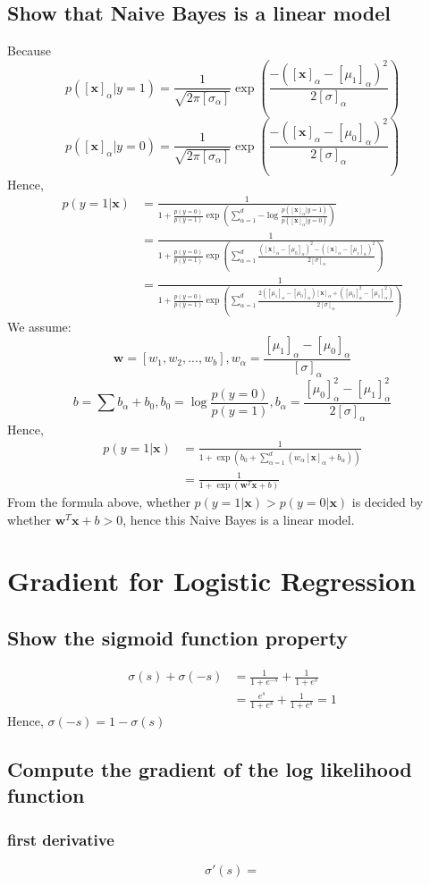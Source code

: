 \documentclass{article}
\begin{document}
	\subsection{Show that Naive Bayes is a linear model}
	Because
	\[
		p([\textbf{x}]_{\alpha}|y=1)=
		\frac{1}{\sqrt{2\pi[\sigma_{\alpha}]}}
		\exp\left({
			\frac{
			-([\textbf{x}]_{\alpha}-[\mu_1]_{\alpha})^2
			}{
				2[\sigma]_{\alpha}
			}
		}\right)
	\]
	\[
		p([\textbf{x}]_{\alpha}|y=0)=
		\frac{1}{\sqrt{2\pi[\sigma_{\alpha}]}}
		\exp\left({
			\frac{
			-([\textbf{x}]_{\alpha}-[\mu_0]_{\alpha})^2
			}{
				2[\sigma]_{\alpha}
			}
		}\right)
	\]
	Hence,
	\[
		\begin{split}
			p(y=1|\textbf{x})&=\frac{1}{1+\frac{p(y=0)}{p(y=1)}\exp{\left(\sum_{\alpha=1}^d{-\log{\frac{p([\textbf{x}]_\alpha|y=1)}{p([\textbf{x}]_\alpha|y=0)}}}\right)}}\\
			&=\frac{1}{1+\frac{p(y=0)}{p(y=1)}\exp{\left(\sum_{\alpha=1}^d{\frac{([\textbf{x}]_{\alpha}-[\mu_0]_{\alpha})^2-([\textbf{x}]_{\alpha}-[\mu_1]_{\alpha})^2}{2[\sigma]_{\alpha}}}\right)}}\\
			&=\frac{1}{1+\frac{p(y=0)}{p(y=1)}\exp{\left(\sum_{\alpha=1}^d{\frac{2([\mu_1]_{\alpha}- [\mu_0]_{\alpha})[\textbf{x}]_{\alpha}+([\mu_0]_{\alpha}^2-[\mu_1]_{\alpha}^2)}{2[\sigma]_{\alpha}}}\right)}}
		\end{split}
	\]
	We assume:
	\[\textbf{w}=[w_1, w_2,...,w_b], w_\alpha=\frac{[\mu_1]_{\alpha}- [\mu_0]_{\alpha}}{[\sigma]_{\alpha}}\]
	\[b=\sum{b_\alpha}+b_0, b_0=\log{\frac{p(y=0)}{p(y=1)}}, b_\alpha=\frac{[\mu_0]_{\alpha}^2-[\mu_1]_{\alpha}^2}{2[\sigma]_{\alpha}}\]
	Hence,
	\[\begin{split}
		p(y=1|\textbf{x})&=\frac{1}{1+\exp{\left(b_0+\sum_{\alpha=1}^d {(w_\alpha[\textbf{x}]_\alpha+b_\alpha)}\right)}}\\
		&=\frac{1}{1+\exp{\left(\textbf{w}^T\textbf{x}+b\right)}}
	\end{split}\]
	From the formula above, whether $p(y=1|\textbf{x}) > p(y=0|\textbf{x})$ is decided by whether $\textbf{w}^T\textbf{x}+b>0$, hence this Naive Bayes is a linear model.
	
	\section{Gradient for Logistic Regression}
	\subsection{Show the sigmoid function property}
	\[\begin{split}
		\sigma(s)+\sigma(-s)&=\frac{1}{1+e^{-s}}+\frac{1}{1+e^{s}}\\
		&=\frac{e^s}{1+e^{s}}+\frac{1}{1+e^{s}}=1
	\end{split}\]
	Hence, $\sigma(-s)=1-\sigma(s)$
	
	\subsection{Compute the gradient of the log likelihood function}
	\subsubsection{first derivative}
	\[\sigma'(s)=\]
\end{document}
